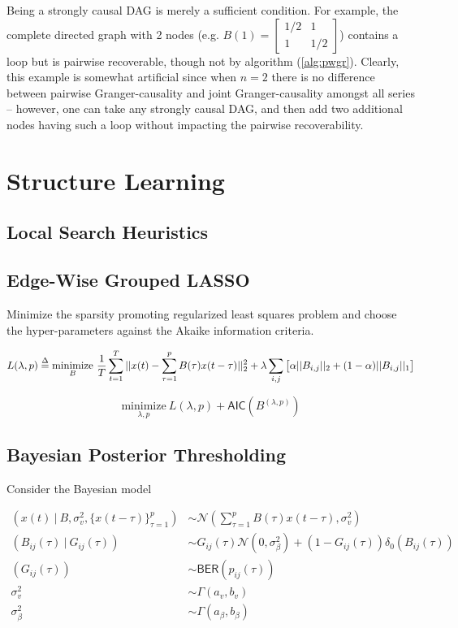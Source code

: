 \documentclass[12pt]{article}
\begin{document}
\begin{example}
  Being a strongly causal DAG is merely a sufficient condition.  For example, the complete directed graph with 2 nodes (e.g. $B(1) = \left[ \begin{array}{cc} 1/2 & 1 \\ 1 & 1/2 \end{array} \right]$) contains a loop but is pairwise recoverable, though not by algorithm (\ref{alg:pwgr}).  Clearly, this example is somewhat artificial since when $n = 2$ there is no difference between pairwise Granger-causality and joint Granger-causality amongst all series -- however, one can take any strongly causal DAG, and then add two additional nodes having such a loop without impacting the pairwise recoverability.
\end{example}

\section{Structure Learning}
\subsection{Local Search Heuristics}


\subsection{Edge-Wise Grouped LASSO}
Minimize the sparsity promoting regularized least squares problem and choose the hyper-parameters against the Akaike information criteria.

\begin{equation}
  L(\lambda, p) \overset{\Delta}{=} \underset{B}{\text{minimize}}\ \frac{1}{T}\sum_{t = 1}^T||x(t) - \sum_{\tau = 1}^pB(\tau)x(t - \tau)||_2^2 + \lambda \sum_{i, j}\big[\alpha||B_{i, j}||_2 + (1 - \alpha)||B_{i, j}||_1\big]
\end{equation}

\begin{equation}
  \underset{\lambda, p}{\text{minimize}}\ L(\lambda, p) + \mathsf{AIC}(B^{(\lambda, p)})
\end{equation}

\subsection{Bayesian Posterior Thresholding}
Consider the Bayesian model

\begin{equation}
  \begin{aligned}
    (x(t)\ |\ B, \sigma_v^2, \{x(t - \tau)\}_{\tau = 1}^p) &\sim \mathcal{N}(\sum_{\tau = 1}^pB(\tau)x(t - \tau), \sigma_v^2)\\
    (B_{ij}(\tau)\ |\ G_{ij}(\tau)) &\sim G_{ij}(\tau)\mathcal{N}(0, \sigma_\beta^2) + (1 - G_{ij}(\tau))\delta_0(B_{ij}(\tau))\\
    (G_{ij}(\tau)) &\sim \mathsf{BER}(p_{ij}(\tau))\\
    \sigma_v^2 &\sim \Gamma(a_v, b_v)\\
    \sigma_\beta^2 &\sim \Gamma(a_\beta, b_\beta)
  \end{aligned}
\end{equation}
\end{document}
